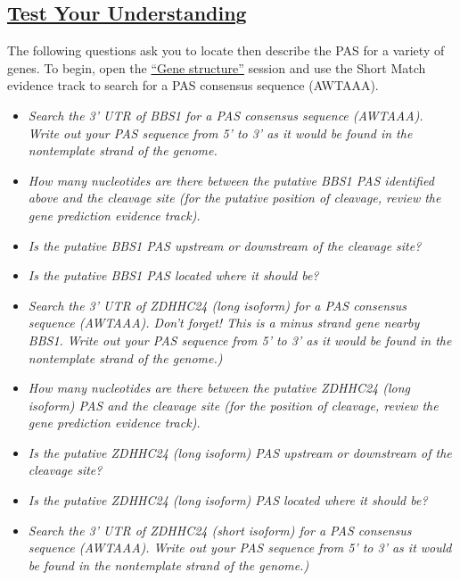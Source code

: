 \documentclass[
]{book}
\providecommand{\tightlist}{%
  \setlength{\itemsep}{0pt}\setlength{\parskip}{0pt}}
\begin{document}
\hypertarget{test-your-understanding-20}{%
\subsection{\texorpdfstring{\href{https://docs.google.com/forms/d/e/1FAIpQLSeLBjNg4Tjg5PpnU6SFMB9PcJzJvLEg6s9iwJKgzQR97Qtftw/viewform?usp=sf_link}{Test Your Understanding}}{Test Your Understanding}}\label{test-your-understanding-20}}

The following questions ask you to locate then describe the PAS for a variety of genes. To begin, open the \href{https://genome.ucsc.edu/s/megallegos/Biol\%20310\%20Module\%201}{``Gene structure''} session and use the Short Match evidence track to search for a PAS consensus sequence (AWTAAA).

\begin{itemize}
\tightlist
\item
  \emph{Search the 3' UTR of BBS1 for a PAS consensus sequence (AWTAAA). Write out your PAS sequence from 5' to 3' as it would be found in the nontemplate strand of the genome.}
\item
  \emph{How many nucleotides are there between the putative BBS1 PAS identified above and the cleavage site (for the putative position of cleavage, review the gene prediction evidence track).}
\item
  \emph{Is the putative BBS1 PAS upstream or downstream of the cleavage site?}
\item
  \emph{Is the putative BBS1 PAS located where it should be?}
\item
  \emph{Search the 3' UTR of ZDHHC24 (long isoform) for a PAS consensus sequence (AWTAAA). Don't forget! This is a minus strand gene nearby BBS1. Write out your PAS sequence from 5' to 3' as it would be found in the nontemplate strand of the genome.)}
\item
  \emph{How many nucleotides are there between the putative ZDHHC24 (long isoform) PAS and the cleavage site (for the position of cleavage, review the gene prediction evidence track).}
\item
  \emph{Is the putative ZDHHC24 (long isoform) PAS upstream or downstream of the cleavage site?}
\item
  \emph{Is the putative ZDHHC24 (long isoform) PAS located where it should be?}
\item
  \emph{Search the 3' UTR of ZDHHC24 (short isoform) for a PAS consensus sequence (AWTAAA). Write out your PAS sequence from 5' to 3' as it would be found in the nontemplate strand of the genome.)}

\end{itemize}
\end{document}
